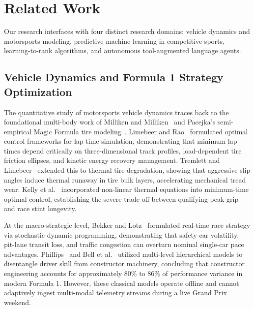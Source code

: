 \documentclass[journal]{IEEEtran}
\begin{document}
\section{Related Work}
\label{sec:related_work}
Our research interfaces with four distinct research domains: vehicle dynamics and motorsports modeling, predictive machine learning in competitive sports, learning-to-rank algorithms, and autonomous tool-augmented language agents.

\subsection{Vehicle Dynamics and Formula 1 Strategy Optimization}
The quantitative study of motorsports vehicle dynamics traces back to the foundational multi-body work of Milliken and Milliken~\cite{milliken1995race} and Pacejka's semi-empirical Magic Formula tire modeling~\cite{pacejka2005tire}. Limebeer and Rao~\cite{limebeer2015optimal} formulated optimal control frameworks for lap time simulation, demonstrating that minimum lap times depend critically on three-dimensional track profiles, load-dependent tire friction ellipses, and kinetic energy recovery management. Tremlett and Limebeer~\cite{tremlett2015optimal} extended this to thermal tire degradation, showing that aggressive slip angles induce thermal runaway in tire bulk layers, accelerating mechanical tread wear. Kelly et al.~\cite{kelly2020minimum} incorporated non-linear thermal equations into minimum-time optimal control, establishing the severe trade-off between qualifying peak grip and race stint longevity. 

At the macro-strategic level, Bekker and Lotz~\cite{bekker2020race} formulated real-time race strategy via stochastic dynamic programming, demonstrating that safety car volatility, pit-lane transit loss, and traffic congestion can overturn nominal single-car pace advantages. Phillips~\cite{phillips2014f1} and Bell et al.~\cite{bell2016formula} utilized multi-level hierarchical models to disentangle driver skill from constructor machinery, concluding that constructor engineering accounts for approximately 80\% to 86\% of performance variance in modern Formula 1. However, these classical models operate offline and cannot adaptively ingest multi-modal telemetry streams during a live Grand Prix weekend.
\end{document}
